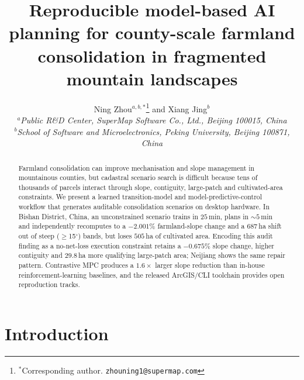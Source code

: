 \documentclass[11pt]{article}
\begin{document}
\title{Reproducible model-based AI planning for county-scale farmland consolidation in fragmented mountain landscapes}

\author{Ning Zhou$^{a,b,\ast}$\thanks{$^\ast$Corresponding author. \texttt{zhouning1@supermap.com}} and Xiang Jing$^{b}$\\
$^{a}${\em Public R\&D Center, SuperMap Software Co., Ltd., Beijing 100015, China}\\
$^{b}${\em School of Software and Microelectronics, Peking University, Beijing 100871, China}}

\date{}
\maketitle
\sloppy  %

\begin{abstract}
Farmland consolidation can improve mechanisation and slope management in mountainous counties, but cadastral scenario search is difficult because tens of thousands of parcels interact through slope, contiguity, large-patch and cultivated-area constraints. We present a learned transition-model and model-predictive-control workflow that generates auditable consolidation scenarios on desktop hardware. In Bishan District, China, an unconstrained scenario trains in $25$\,min, plans in ${\sim}5$\,min and independently recomputes to a $-2.001\%$ farmland-slope change and a $687$\,ha shift out of steep ($\geq$15$^\circ$) bands, but loses $505$\,ha of cultivated area. Encoding this audit finding as a no-net-loss execution constraint retains a $-0.675\%$ slope change, higher contiguity and $29.8$\,ha more qualifying large-patch area; Neijiang shows the same repair pattern. Contrastive MPC produces a $1.6\times$ larger slope reduction than in-house reinforcement-learning baselines, and the released ArcGIS/CLI toolchain provides open reproduction tracks.
\end{abstract}

\section{Introduction}\label{sec:intro}
\end{document}

